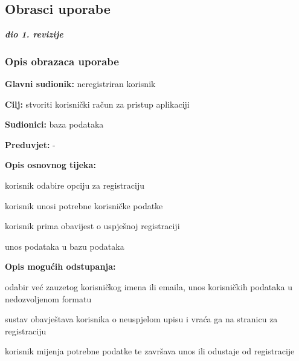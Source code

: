 			\eject 
			
			
				
			\subsection{Obrasci uporabe}
				
				\textbf{\textit{dio 1. revizije}}
				
				\subsubsection{Opis obrazaca uporabe}
					
					\noindent {}
					\begin{packed_item}
	
						\item \textbf{Glavni sudionik: } neregistriran korisnik
						\item  \textbf{Cilj:} stvoriti korisnički račun za pristup aplikaciji
						\item  \textbf{Sudionici:} baza podataka
						\item  \textbf{Preduvjet:} -
						\item  \textbf{Opis osnovnog tijeka:}
						
						\item[] \begin{packed_enum}
	
							\item korisnik odabire opciju za registraciju
							\item korisnik unosi potrebne korisničke podatke
							\item korisnik prima obavijest o uspješnoj registraciji
							\item unos podataka u bazu podataka
						\end{packed_enum}
						
						\item  \textbf{Opis mogućih odstupanja:}
						
						\item[] \begin{packed_item}
	
							\item[2.a] odabir već zauzetog korisničkog imena ili emaila, unos korisničkih podataka u nedozvoljenom formatu
							\item[] \begin{packed_enum}
								\item sustav obavještava korisnika o neuspjelom upisu i vraća ga na stranicu za registraciju
								\item korisnik mijenja potrebne podatke te završava unos ili odustaje od registracije
							\end{packed_enum}
							
						\end{packed_item}
					\end{packed_item}
					
